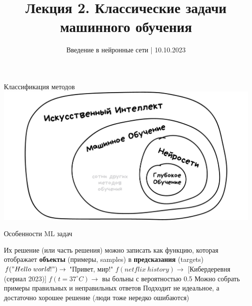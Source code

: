 \documentclass[aspectratio=169, professionalfonts]{beamer}
\title{Лекция 2. Классические задачи машинного обучения}
\date{Введение в нейронные сети | 10.10.2023}
\begin{document}
\maketitle

\begin{frame}{Классификация методов}
    \centering
    \includegraphics[width=.9\linewidth]{figures/fig1-terms.jpg}
\end{frame}

\begin{frame}{Особенности ML задач}
    \begin{outline}
        \1 Их решение (или часть решения) можно записать как функцию, которая отображает
        \textbf{объекты} (примеры, samples) в \textbf{предсказания} (targets)
            \2 \( f("Hello \ world!") \to \) "Привет, мир!"
            \2 \( f(netflix \ history) \to \) [Кибердеревня (сериал 2023)]
            \2 \( f(t = 37^\circ C) \to \) вы больны с вероятностью 0.5
        \1 Можно собрать примеры правильных и неправильных ответов
        \1 Подходит не идеальное, а достаточно хорошее решение
            (люди тоже нередко ошибаются)
    \end{outline}
\end{frame}
\end{document}
